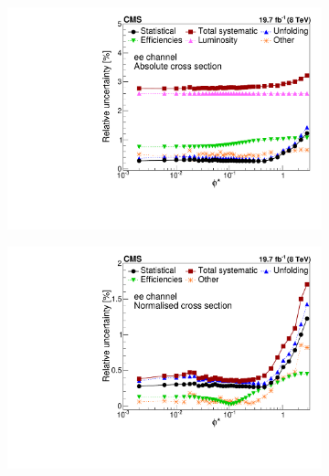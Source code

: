 \begin{figure}
    \centering
    \begin{subfigure}[b]{0.49\textwidth}
     \includegraphics[width=\linewidth]{figures/uncertainties/UncertaintyElecAbs.pdf}
     \caption{}
    \end{subfigure}
    \begin{subfigure}[b]{0.49\textwidth}
     \includegraphics[width=\linewidth]{figures/uncertainties/UncertaintyElecNorm.pdf}
     \caption{}
    \end{subfigure}
    \begin{subfigure}[b]{0.49\textwidth}

\end{subfigure}
\end{figure}
